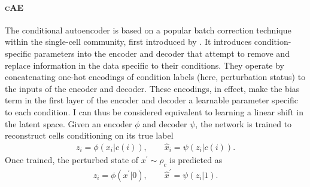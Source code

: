 \paragraph{\textsc{cAE}}
The conditional autoencoder is based on a popular batch correction technique within the single-cell community, first introduced by \citet{lopez2018}.
It introduces condition-specific parameters into the encoder and decoder that attempt to remove and replace information in the data specific to their conditions.
They operate by concatenating one-hot encodings of condition labels (here, perturbation status) to the inputs of the encoder and decoder.
These encodings, in effect, make the bias term in the first layer of the encoder and decoder a learnable parameter specific to each condition. I can thus be considered equivalent to learning a linear shift in the latent space.
Given an encoder $\phi$ and decoder $\psi$, the network is trained to reconstruct cells conditioning on its true label
\begin{align*}
    z_i = \phi( x_i | c(i)), \quad \quad \hat{x}_i = \psi(z_i | c(i)).
\end{align*}
Once trained, the perturbed state of $x^\prime \sim \rho_c$ is predicted as
\begin{align*}
        z_i = \phi( x^\prime | 0), \quad \quad \hat{x}^\prime = \psi(z_i | 1).
\end{align*}
